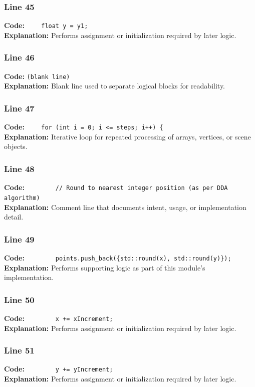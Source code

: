 \documentclass[11pt,a4paper]{article}
\begin{document}
\subsubsection*{Line 45}
\textbf{Code:} \verb|    float y = y1;|\\
\textbf{Explanation:} Performs assignment or initialization required by later logic.

\subsubsection*{Line 46}
\textbf{Code:} \texttt{(blank line)}\\
\textbf{Explanation:} Blank line used to separate logical blocks for readability.

\subsubsection*{Line 47}
\textbf{Code:} \verb|    for (int i = 0; i <= steps; i++) {|\\
\textbf{Explanation:} Iterative loop for repeated processing of arrays, vertices, or scene objects.

\subsubsection*{Line 48}
\textbf{Code:} \verb|        // Round to nearest integer position (as per DDA algorithm)|\\
\textbf{Explanation:} Comment line that documents intent, usage, or implementation detail.

\subsubsection*{Line 49}
\textbf{Code:} \verb|        points.push_back({std::round(x), std::round(y)});|\\
\textbf{Explanation:} Performs supporting logic as part of this module's implementation.

\subsubsection*{Line 50}
\textbf{Code:} \verb|        x += xIncrement;|\\
\textbf{Explanation:} Performs assignment or initialization required by later logic.

\subsubsection*{Line 51}
\textbf{Code:} \verb|        y += yIncrement;|\\
\textbf{Explanation:} Performs assignment or initialization required by later logic.
\end{document}
